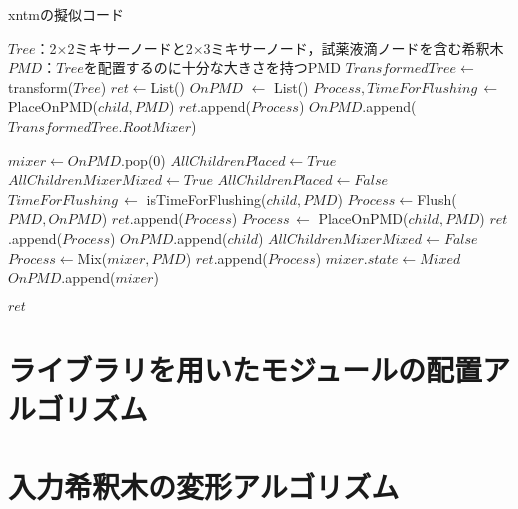 \begin{algorithm}[tbp]
 \caption{xntmの擬似コード}\label{alg:prop}
 \begin{algorithmic}[1]
     \Require $\mathit{Tree}$：2$\times$2ミキサーノードと2$\times$3ミキサーノード，試薬液滴ノードを含む希釈木 
     \Require $\mathit{PMD}$：$\mathit{Tree}$を配置するのに十分な大きさを持つPMD  
     \State $\mathit{TransformedTree} \gets$ transform($Tree$) \label{transform_pseudo}
     \State $\mathit{ret} \gets $List() \label{xntm_pseudo}
     \State $\mathit{OnPMD}$ $\gets$ List() \label{xntm}
     \State $\mathit{Process,TimeForFlushing}\,\gets $  PlaceOnPMD($\mathit{child,PMD}$)
     \State $\mathit{ret}$.append($\mathit{Process}$)
     \State $\mathit{OnPMD}$.append($TransformedTree.RootMixer$)
    
    \State {}
        \State$\mathit{mixer} \gets  \mathit{OnPMD}$.pop(0)
        \State $\mathit{AllChildrenPlaced}\gets\mathit{True}$
        \State $\mathit{AllChildrenMixerMixed}\gets\mathit{True}$
                \State$\mathit{AllChildrenPlaced \gets False}$
                \State $\mathit{TimeForFlushing}\, \gets$  isTimeForFlushing($\mathit{child,PMD}$) 
                    \State $\mathit{Process}\gets$Flush($\mathit{PMD,OnPMD}$)
                    \State $\mathit{ret}$.append($\mathit{Process}$)
                \EndIf
                \State $\mathit{Process}\, \gets$  PlaceOnPMD($\mathit{child,PMD}$)
                \State $\mathit{ret}$.append($\mathit{Process}$)
                \State $\mathit{OnPMD}$.append($\mathit{child}$) 
            \EndIf 
                \State $\mathit{AllChildrenMixerMixed}\gets\mathit{False}$
            \EndIf 
        \EndFor 
            \State$\mathit{Process}\gets$Mix($\mathit{mixer,PMD}$)
            \State $\mathit{ret}$.append($\mathit{Process}$)
            \State$\mathit{mixer.state} \gets \mathit{Mixed}$ 
        \EndIf
        \State$\mathit{OnPMD}$.append($\mathit{mixer}$)
    \EndWhile 

     \Return $\mathit{ret}$
 \end{algorithmic}
\end{algorithm}

\section{ライブラリを用いたモジュールの配置{アルゴリズム}}
\section{入力希釈木の変形アルゴリズム}



